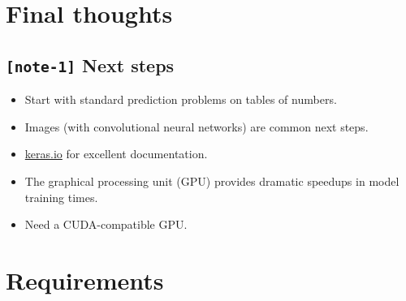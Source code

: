 \documentclass[11pt, twoside]{article}
\begin{document}
    \hypertarget{final-thoughts}{%
\section{Final thoughts}\label{final-thoughts}}

    \hypertarget{note-1-next-steps}{%
\subsection{\texorpdfstring{\texttt{{[}note-1{]}} Next
steps}{{[}note-1{]} Next steps}}\label{note-1-next-steps}}

\begin{itemize}
\item
  Start with standard prediction problems on tables of numbers.
\item
  Images (with convolutional neural networks) are common next steps.
\item
  \href{https://keras.io}{keras.io} for excellent documentation.
\item
  The graphical processing unit (GPU) provides dramatic speedups in
  model training times.
\item
  Need a CUDA-compatible GPU.
\end{itemize}

    \hypertarget{requirements}{%
\section{Requirements}\label{requirements}}
\end{document}
